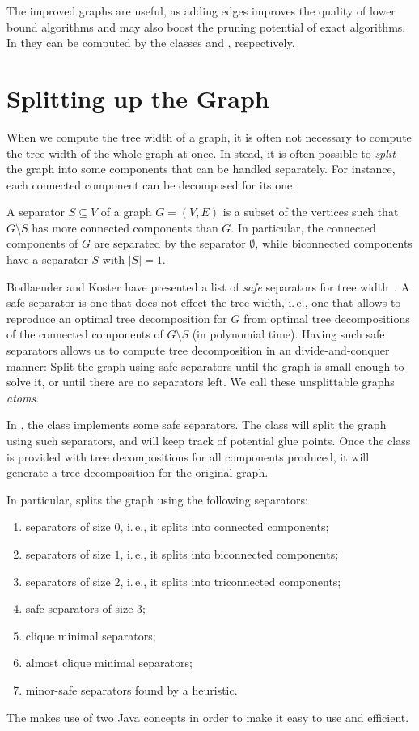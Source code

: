 \documentclass[a4paper, ukenglish, twoside, openright]{jdrasilmanual}
\begin{document}
The improved graphs are useful, as adding edges improves the quality
of lower bound algorithms and may also boost the pruning potential of
exact algorithms. In \Jdrasil{} they can be computed by the classes
 and , respectively. 

\chapter{Splitting up the Graph}
When we compute the tree width of a graph, it is often not necessary
to compute the tree width of the whole graph at once. In stead, it is
often possible to \emph{split} the graph into some components that can
be handled separately. For instance, each connected component can be
decomposed for its one.

A separator $S\subseteq V$ of a graph $G=(V,E)$ is a subset of the
vertices such that $G\setminus S$ has more connected components
than $G$. In particular, the connected components of $G$ are separated
by the separator $\emptyset$, while biconnected components have a
separator $S$ with $|S|=1$.

Bodlaender and Koster have presented a list of \emph{safe} separators
for tree width~\cite{BodlaenderK2006}. A safe separator is one that
does not effect the tree width, i.\,e., one that allows to reproduce
an optimal tree decomposition for $G$ from optimal tree decompositions
of the connected components of $G\setminus S$ (in polynomial
time). Having such safe separators allows us to compute tree
decomposition in an divide-and-conquer manner: Split the graph using
safe separators until the graph is small enough to solve it, or until
there are no separators left. We call these unsplittable graphs \emph{atoms}.

In \Jdrasil, the class  implements some safe
separators. The class will split the graph using such separators, and
will keep track of potential glue points. Once the class is provided
with tree decompositions for all components produced, it will generate
a tree decomposition for the original graph.

In particular,  splits the graph using the
following separators:
\begin{enumerate}
  \item separators of size $0$, i.\,e., it splits into connected
    components;
  \item separators of size $1$, i.\,e., it splits into biconnected
    components;
  \item separators of size $2$, i.\,e., it splits into triconnected
    components;
  \item safe separators of size $3$;
  \item clique minimal separators;
  \item almost clique minimal separators;
  \item minor-safe separators found by a heuristic.
\end{enumerate}
The  makes use of two Java concepts in order to
make it easy to use and efficient.
\end{document}
